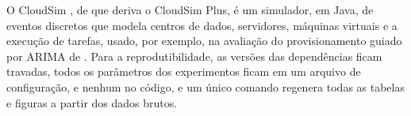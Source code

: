 O CloudSim \cite{calheiros2011cloudsim}, de que deriva o CloudSim Plus, é um simulador, em Java, de eventos discretos que modela centros de dados, servidores, máquinas virtuais e a execução de tarefas, usado, por exemplo, na avaliação do provisionamento guiado por ARIMA de . Para a reprodutibilidade, as versões das dependências ficam travadas, todos os parâmetros dos experimentos ficam em um arquivo de configuração, e nenhum no código, e um único comando regenera todas as tabelas e figuras a partir dos dados brutos.
